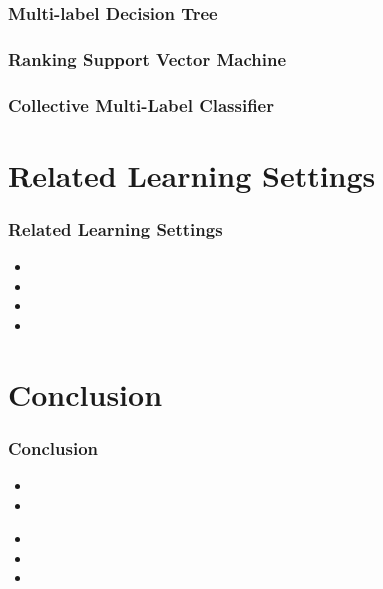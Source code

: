 \documentclass{beamer}
\begin{document}
\begin{frame}
\frametitle{Multi-label Decision Tree}

\end{frame}
\begin{frame}
\frametitle{Ranking Support Vector Machine}

\end{frame}
\begin{frame}
\frametitle{Collective Multi-Label Classifier}

\end{frame}
\section{Related Learning Settings}

\begin{frame}
\frametitle{Related Learning Settings}
\begin{itemize}
\item 
\item 
\item 
\item 
\end{itemize}
\end{frame}

\section{Conclusion}
\begin{frame}
\frametitle{Conclusion}
\begin{itemize}
\item 
\item 
\end{itemize}
\begin{itemize}
\item <5-> 
\item <6->
\item <7-> 
\end{itemize}
\end{frame}
\end{document}
